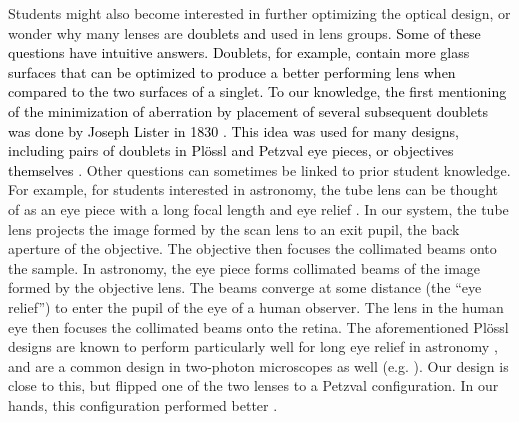 \documentclass[10pt,letterpaper]{article}
\begin{document}
Students might also become interested in further optimizing the optical design, or wonder why many lenses are \textcolor{black}{doublets and} used in lens groups. \textcolor{black}{Some of these questions have intuitive answers. Doublets, for example, contain more glass surfaces that can be optimized to produce a better performing lens when compared to the two surfaces of a singlet\cite{ThorlabsLens}. To our knowledge, the first mentioning of the minimization of aberration by placement of several subsequent doublets was done by Joseph Lister in 1830 \cite{Lister1830}. This idea was used for many designs, including pairs of doublets in Pl\"ossl and Petzval eye pieces, or objectives themselves \cite{Zhang2019}}. Other questions can sometimes be linked to prior student knowledge. For example, for students interested in astronomy, the tube lens can be thought of as an eye piece with a long focal length and eye relief \cite{Smith2007}. In our system, the tube lens projects the image formed by the scan lens to an exit pupil, the back aperture of the objective. The objective then focuses the collimated beams onto the sample. In astronomy, the eye piece forms collimated beams of the image formed by the objective lens. The beams converge at some distance (the ``eye relief'') to enter the pupil of the eye of a human observer. The lens in the human eye then focuses the collimated beams onto the retina. The aforementioned Pl\"ossl designs are known to perform particularly well for long eye relief in astronomy \cite{Smith2007, Nagler1983}, and are a common design in two-photon microscopes as well (e.g. \cite{Rupprecht2024}). Our design is close to this, but flipped one of the two lenses to a Petzval configuration. In our hands, this configuration performed better \cite{Hong2022, Bumstead2018, Mayrhofer2015}.\newline
\end{document}
